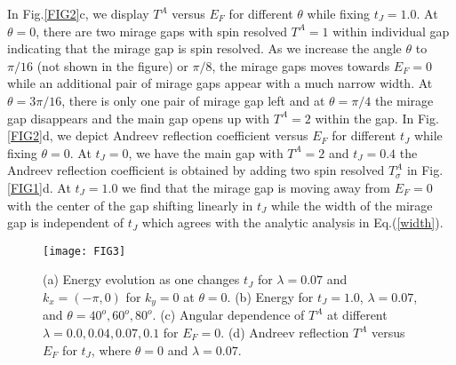 \documentclass[aps, prb, twocolumn, amssymb, amsmath, showpacs, superscriptaddress]{revtex4-1}
\begin{document}
In Fig.\ref{FIG2}c, we display $T^A$ versus $E_F$ for different $\theta$ while fixing $t_J=1.0$. At $\theta=0$, there are two mirage gaps with spin resolved $T^A=1$ within individual gap indicating that the mirage gap is spin resolved. As we increase the angle $\theta$ to $\pi/16$ (not shown in the figure) or $\pi/8$, the mirage gaps moves towards $E_F=0$ while an additional pair of mirage gaps appear with a much narrow width. At $\theta = 3\pi/16$, there is only one pair of mirage gap left and at $\theta=\pi/4$ the mirage gap disappears and the main gap opens up with $T^A=2$ within the gap.
In Fig.\ref{FIG2}d, we depict Andreev reflection coefficient versus $E_F$ for different $t_J$ while fixing $\theta=0$. At $t_J=0$, we have the main gap with $T^A=2$ and $t_J=0.4$ the Andreev reflection coefficient is obtained by adding two spin resolved $T^A_\sigma$ in Fig.\ref{FIG1}d. At $t_J=1.0$ we find that the mirage gap is moving away from $E_F=0$ with the center of the gap shifting linearly in $t_J$ while the width of the mirage gap is independent of $t_J$ which agrees with the analytic analysis in Eq.(\ref{width}).

\begin{figure}[ht!]
\centering
\texttt{[image: FIG3]}
\caption{
\label{FIG3}
(a) Energy evolution as one changes $t_J$ for $\lambda=0.07$ and $k_x=(-\pi,0)$ for $k_y=0$ at $\theta=0$. (b) Energy for $t_J=1.0$, $\lambda=0.07$, and $\theta = 40^o, 60^o, 80^o$.
(c) Angular dependence of $T^A$ at different $\lambda=0.0, 0.04, 0.07, 0.1$ for $E_F=0$.
(d) Andreev reflection $T^A$ versus $E_F$ for $t_J$, where $\theta=0$ and $\lambda=0.07$.
}
\end{figure}
\end{document}
